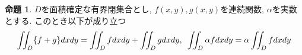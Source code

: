 \documentclass[dvipdfmx,a4paper,11pt]{article}
\newcommand{\Area}{S}
\theoremstyle{definition}
\newtheorem{thm}{定理}
\newtheorem{prop}[thm]{命題}
\newtheorem{exa}[thm]{例}
\newcommand{\pdrv}[2]{\frac{\partial #1}{\partial #2}}
\begin{document}
      \begin{tcolorbox}[
    colback = white,
    colframe = green!35!black,
    fonttitle = \bfseries,
    breakable = true]
    \begin{prop}
$D$を面積確定な有界閉集合とし, 
$f(x,y), g(x,y)$を連続関数, $\alpha$を実数とする.
このとき以下が成り立つ
$$
\iint _{D}\{f +g\}dxdy = \iint _{D}fdxdy + \iint _{D}gdxdy, \text{\,\,}
 \iint _{D}\alpha fdxdy = \alpha  \iint _{D}fdxdy
$$

        \end{prop}

    \end{tcolorbox}

\end{document}
